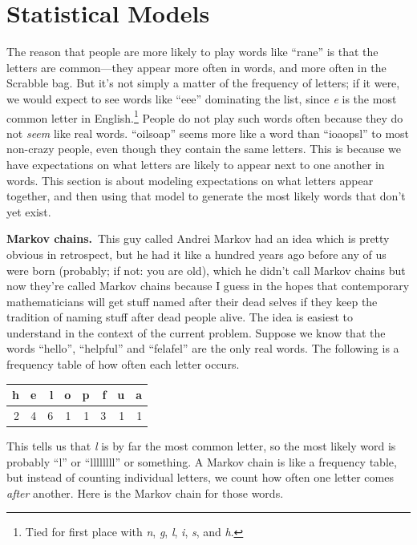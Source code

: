 \documentclass[twocolumn]{article}
\begin{document}
\section{Statistical Models}

The reason that people are more likely to play words like ``rane'' is
that the letters are common---they appear more often in words, and
more often in the Scrabble bag. But it's not simply a matter of the
frequency of letters; if it were, we would expect to see words like
``eee'' dominating the list, since {\it e} is the most common letter
in English.\!\footnote{Tied for first place with {\it n}, {\it g},
{\it l}, {\it i}, {\it s}, and {\it h}.} People do not play such words
often because they do not {\it seem} like real words. ``oilsoap''
seems more like a word than ``ioaopsl'' to most non-crazy people,
even though they contain the same letters. This is because we have
expectations on what letters are likely to appear next to one
another in words. This section is about modeling expectations on
what letters appear together, and then using that model to generate
the most likely words that don't yet exist.

{\bf Markov chains.}\,
This guy called Andrei Markov had an idea which is pretty obvious in
retrospect, but he had it like a hundred years ago before any of us
were born (probably; if not: you are old), which he didn't call Markov
chains but now they're called Markov chains because I guess in the
hopes that contemporary mathematicians will get stuff named after
their dead selves if they keep the tradition of naming stuff after
dead people alive. The idea is easiest to understand in the context
of the current problem. Suppose we know that the words ``hello'',
``helpful'' and ``felafel'' are the only real words. The following
is a frequency table of how often each letter occurs.

\begin{center}
\begin{tabular}{|r|r|r|r|r|r|r|r|} %
\hline
h   & e   & l   & o   & p   & f   & u   & a    \\
\hline
2   & 4   & 6   & 1   & 1   & 3   & 1   & 1    \\
\hline
\end{tabular}
\end{center}

This tells us that {\it l} is by far the most common letter, so the
most likely word is probably ``l'' or ``llllllll'' or something. A
Markov chain is like a frequency table, but instead of counting
individual letters, we count how often one letter comes {\it after}
another. Here is the Markov chain for those words.
\end{document}
